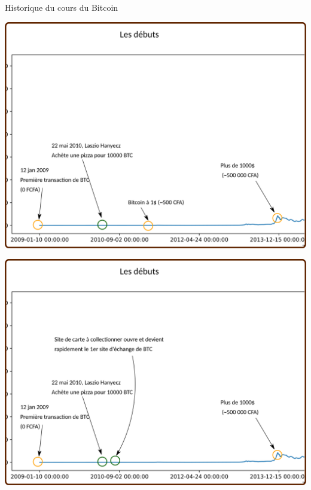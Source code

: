 \documentclass[presentation]{beamer}
\begin{document}
\begin{frame}[label={sec:org6ff9387}]{Historique du cours du Bitcoin}
\begin{block}{}
\begin{center}
\includegraphics[width=.95\textwidth]{./Pictures/Timeline/04debut_pizza.png}
\end{center}
\end{block}

\begin{block}{}
\begin{center}
\includegraphics[width=.95\textwidth]{./Pictures/Timeline/05debut_mtdox.png}
\end{center}
\end{block}


\end{frame}
\end{document}
